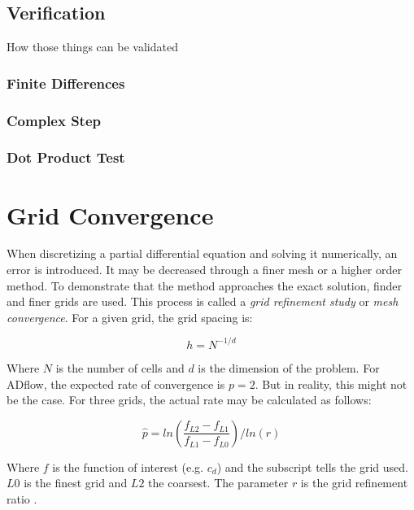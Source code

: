\subsection{Verification}
How those things can be validated 
\subsubsection{Finite Differences}
\subsubsection{Complex Step}
\subsubsection{Dot Product Test}




\section{Grid Convergence}
When discretizing a partial differential equation and solving it numerically,
an error is introduced. It may be decreased through a finer mesh or a higher
order method. To demonstrate that the method approaches the exact solution,
finder and finer grids are used. This process is called a \textit{grid
refinement study} or \textit{mesh convergence}. For a given grid, the grid
spacing is:

\begin{equation}
  h = N^{-1/d}
\end{equation}

\noindent Where $N$ is the number of cells and $d$ is the dimension of the
problem.
For ADflow, the expected rate of convergence is $p=2$. But in reality, this
might not be the case. For three grids, the actual rate may be calculated as
follows:

\begin{equation}
  \hat p = ln(\frac{f_{L2} - f_{L1}}{f_{L1} - f_{L0}}) / ln(r)
  \label{eq:conv_rate}
\end{equation}

\noindent Where $f$ is the function of interest (e.g. $c_{d}$) and the subscript
tells the grid used. $L0$ is the finest grid and $L2$ the coarsest. The
parameter $r$ is the grid refinement ratio .\cite{grid_refinement}
